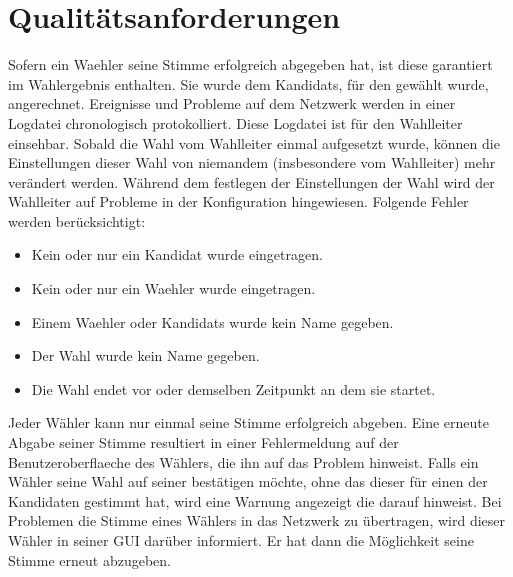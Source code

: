 \documentclass[parskip=full,11pt,twoside]{scrartcl}
\begin{document}
\section{Qualitätsanforderungen}
Sofern ein \gls{Waehler} seine \gls{Stimme} erfolgreich abgegeben hat, ist diese garantiert im Wahlergebnis enthalten. Sie wurde dem \glspl{Kandidat}, für den gewählt wurde, angerechnet.
Ereignisse und Probleme auf dem \gls{Netzwerk} werden in einer \gls{Logdatei} chronologisch protokolliert. Diese \gls{Logdatei} ist für den \gls{Wahlleiter} einsehbar.
Sobald die Wahl vom \gls{Wahlleiter} einmal aufgesetzt wurde, können die Einstellungen dieser Wahl von niemandem (insbesondere vom \gls{Wahlleiter}) mehr verändert werden.
Während dem festlegen der Einstellungen der Wahl wird der \gls{Wahlleiter} auf Probleme in der \gls{Konfiguration} hingewiesen. Folgende Fehler werden berücksichtigt:
	\begin{itemize}
		\item Kein oder nur ein \gls{Kandidat} wurde eingetragen.
		\item Kein oder nur ein \gls{Waehler} wurde eingetragen.
		\item Einem \gls{Waehler} oder \glspl{Kandidat} wurde kein Name gegeben.
		\item Der \gls{Wahl} wurde kein Name gegeben.
		\item Die \gls{Wahl} endet vor oder demselben Zeitpunkt an dem sie startet.
	\end{itemize}
Jeder Wähler kann nur einmal seine Stimme erfolgreich abgeben. Eine erneute Abgabe seiner Stimme resultiert in einer Fehlermeldung auf der \gls{Benutzeroberflaeche} des Wählers, die ihn auf das Problem hinweist.
Falls ein Wähler seine Wahl auf seiner  bestätigen möchte, ohne das dieser für einen der Kandidaten gestimmt hat, wird eine Warnung angezeigt die darauf hinweist.
Bei Problemen die Stimme eines Wählers in das \gls{Netzwerk} zu übertragen, wird dieser Wähler in seiner GUI darüber informiert. Er hat dann die Möglichkeit seine Stimme erneut abzugeben. 
\end{document}
